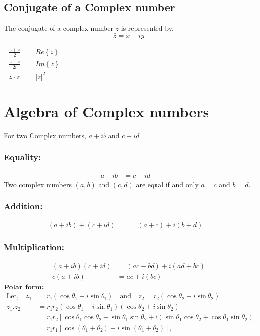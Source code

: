      \subsection{Conjugate of a Complex number}
	The conjugate of a complex number $z$ is represented by, $${\bar{z}=x-i y}$$
	\begin{note}\newline 
	$ \left. \right. $ \hspace{1.5cm}	$\begin{aligned}
		\frac{z + \bar{z}}{2}&=Re\left\lbrace z\right\rbrace \\
		\frac{z - \bar{z}}{2i}&=Im\left\lbrace z\right\rbrace\\
		z \cdot \bar{z}&=|z|^{2}
		\end{aligned}$
	\end{note}

\section{Algebra of Complex numbers}
For two Complex numbers, $a+i b$ and $c+i d $
\subsubsection{Equality:}
	\begin{align*}
	a+i b&=c+i d \quad
	\end{align*}
	Two complex numbers $(a, b)$
 and $(c, d)$ are equal if and only $a=c$ and $b=d$.
 \subsubsection{Addition:} 
 \begin{align*}
 (a+i b)+(c+i d) \quad&=(a+c)+i(b+d) \quad
 \end{align*}
 \subsubsection{Multiplication:} \begin{align*}
 (a+i b)(c+i d) &=(a c-b d)+i(a d+b c) \\
 c(a+i b)&=a c+i(b c)
 \end{align*}
 \textbf{Polar form:} 
 \begin{align*} 
 \text{Let,} \quad z_{1}&=r_{1}\left(\cos \theta_{1}+i \sin \theta_{1}\right) \quad \text{and}\quad z_{2}=r_{2}\left(\cos \theta_{2}+i \sin \theta_{2}\right)\\
 z_{1} . z_{2} &=r_{1} r_{2}\left(\cos \theta_{1}+i \sin \theta_{1}\right)\left(\cos \theta_{2}+i \sin \theta_{2}\right) \\ &=r_{1} r_{2}\left[\cos \theta_{1} \cos \theta_{2}-\sin \theta_{1} \sin \theta_{2}+i\left(\sin \theta_{1} \cos \theta_{2}+\cos \theta_{1} \sin \theta_{2}\right)\right] \\ &=r_{1} r_{1}\left[\cos \left(\theta_{1}+\theta_{2}\right)+i \sin \left(\theta_{1}+\theta_{2}\right)\right], \end{align*}
 
